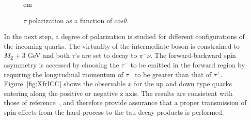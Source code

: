 \documentclass[12pt]{article}
\def\Tau{\ensuremath{\tau}\xspace}
\def\TauMin{\ensuremath{\tau^-}\xspace}
\def\TauPlus{\ensuremath{\tau^+}\xspace}
\def\PI{\ensuremath{\pi^{-}\nu}\xspace}
\begin{document}
\begin{figure}
 \centering
 cm
 \caption{\Tau polarization as a function of $cos\theta$.}
 \label{fig:TauPolCos}
\end{figure}


In the next step, a degree of polarization is studied for different configurations
of the incoming quarks. The virtuality of the intermediate boson is constrained to $M_\mathrm{Z}\pm$3 GeV
and both \Tau's are set to decay to \PI.
The forward-backward spin asymmetry is accessed by choosing the
\TauMin to be emitted in the forward region by requiring
the longitudinal momentum of \TauMin to be greater than that of \TauPlus. 
Figure~\ref{fig:XfrICC} shows the observable $x$ for the up and down type quarks
entering along the positive or negative z axis.
The results are consistent with those of reference~\cite{TauSpinERWZW},
and therefore provide assurance that a proper transmission of spin effects from the hard process
to the tau decay products is performed.
\end{document}
